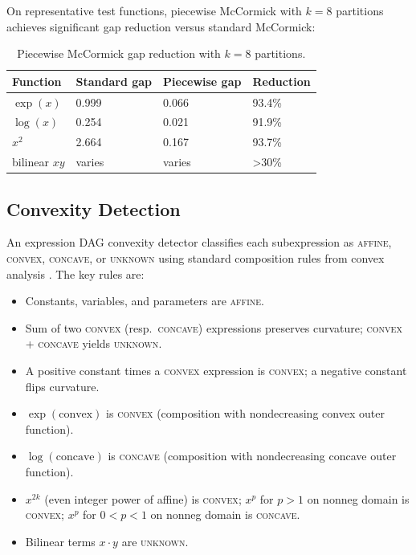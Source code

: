 \documentclass[12pt,preprint]{article}
\begin{document}
On representative test functions, piecewise McCormick with $k=8$ partitions achieves significant gap reduction versus standard McCormick:


\begin{table}[htbp]
\centering
\begin{tabular}{llll}
\toprule
Function & Standard gap & Piecewise gap & Reduction \\
\midrule
$\exp(x)$ & 0.999 & 0.066 & 93.4\% \\
$\log(x)$ & 0.254 & 0.021 & 91.9\% \\
$x^2$ & 2.664 & 0.167 & 93.7\% \\
bilinear $xy$ & varies & varies & >30\% \\
\bottomrule
\end{tabular}
\caption{Piecewise McCormick gap reduction with $k=8$ partitions.}
\label{tab-piecewise}
\end{table}

\subsection{Convexity Detection}
\label{org-convexity-detection}
An expression DAG convexity detector classifies each subexpression as \textsc{affine}, \textsc{convex}, \textsc{concave}, or \textsc{unknown} using standard composition rules from convex analysis \cite{Boyd2004}. The key rules are:

\begin{itemize}
\item Constants, variables, and parameters are \textsc{affine}.
\item Sum of two \textsc{convex} (resp.~\textsc{concave}) expressions preserves curvature; \textsc{convex} + \textsc{concave} yields \textsc{unknown}.
\item A positive constant times a \textsc{convex} expression is \textsc{convex}; a negative constant flips curvature.
\item $\exp(\text{convex})$ is \textsc{convex} (composition with nondecreasing convex outer function).
\item $\log(\text{concave})$ is \textsc{concave} (composition with nondecreasing concave outer function).
\item $x^{2k}$ (even integer power of affine) is \textsc{convex}; $x^p$ for $p > 1$ on nonneg domain is \textsc{convex}; $x^p$ for $0 < p < 1$ on nonneg domain is \textsc{concave}.
\item Bilinear terms $x \cdot y$ are \textsc{unknown}.
\end{itemize}
\end{document}

